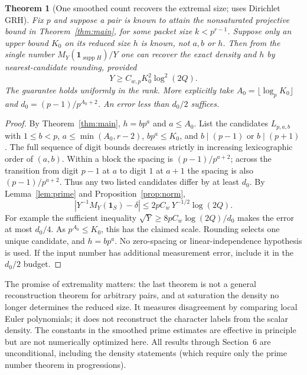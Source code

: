 \documentclass[11pt]{article}
\newtheorem{theorem}{Theorem}[section]
\theoremstyle{remark}\newtheorem{remark}[theorem]{Remark}
\newcommand{\supp}{\operatorname{supp}}
\newcommand{\ind}{\mathbf 1}
\begin{document}
\begin{theorem}[One smoothed count recovers the extremal size; uses Dirichlet GRH]\label{thm:recover}
Fix $p$ and suppose a pair is known to attain the nonsaturated projective bound in Theorem~\ref{thm:main}, for some packet size $k<p^{r-1}$. Suppose only an upper bound $K_0$ on its reduced size $h$ is known, not $a,b$ or $h$. Then from the single number $M_Y(\ind_{\supp H})/Y$ one can recover the exact density and $h$ by nearest-candidate rounding, provided
\[
 Y\ge C_{w,p} K_0^2\log^2(2Q).
\]
The guarantee holds uniformly in the rank. More explicitly take $A_0=\lfloor\log_p K_0\rfloor$ and $d_0=(p-1)/p^{A_0+2}$. An error less than $d_0/2$ suffices.
\end{theorem}
\begin{proof}
By Theorem~\ref{thm:main}, $h=bp^a$ and $a\le A_0$. List the candidates $L_{p,a,b}$ with $1\le b<p$, $a\le\min(A_0,r-2)$, $bp^a\le K_0$, and $b\mid(p-1)$ or $b\mid(p+1)$. The full sequence of digit bounds decreases strictly in increasing lexicographic order of $(a,b)$. Within a block the spacing is $(p-1)/p^{a+2}$; across the transition from digit $p-1$ at $a$ to digit $1$ at $a+1$ the spacing is also $(p-1)/p^{a+2}$. Thus any two listed candidates differ by at least $d_0$. By Lemma~\ref{lem:prime} and Proposition~\ref{prop:norm},
\[
 \left|Y^{-1}M_Y(\ind_S)-\delta\right|\le 2p C_w\,Y^{-1/2}\log(2Q).
\]
For example the sufficient inequality $\sqrt Y\ge 8p C_w\log(2Q)/d_0$ makes the error at most $d_0/4$. As $p^{A_0}\le K_0$, this has the claimed scale. Rounding selects one unique candidate, and $h=bp^a$. No zero-spacing or linear-independence hypothesis is used. If the input number has additional measurement error, include it in the $d_0/2$ budget.
\end{proof}

The promise of extremality matters: the last theorem is not a general reconstruction theorem for arbitrary pairs, and at saturation the density no longer determines the reduced size. It measures disagreement by comparing local Euler polynomials; it does not reconstruct the character labels from the scalar density. The constants in the smoothed prime estimates are effective in principle but are not numerically optimized here. All results through Section~6 are unconditional, including the density statements (which require only the prime number theorem in progressions).
\end{document}
